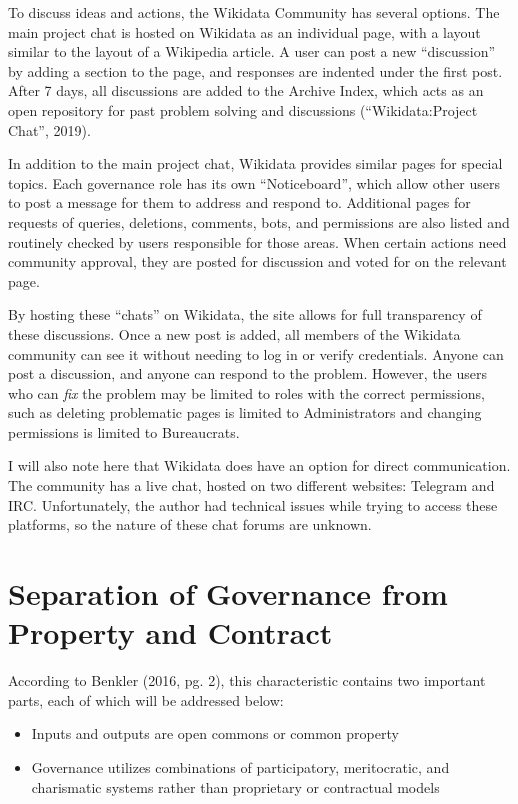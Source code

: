 \documentclass[]{article}
\begin{document}
To discuss ideas and actions, the Wikidata Community has several
options. The main project chat is hosted on Wikidata as an individual
page, with a layout similar to the layout of a Wikipedia article. A user
can post a new ``discussion'' by adding a section to the page, and
responses are indented under the first post. After 7 days, all
discussions are added to the Archive Index, which acts as an open
repository for past problem solving and discussions (``Wikidata:Project
Chat'', 2019).

In addition to the main project chat, Wikidata provides similar pages
for special topics. Each governance role has its own ``Noticeboard'',
which allow other users to post a message for them to address and
respond to. Additional pages for requests of queries, deletions,
comments, bots, and permissions are also listed and routinely checked by
users responsible for those areas. When certain actions need community
approval, they are posted for discussion and voted for on the relevant
page.

By hosting these ``chats'' on Wikidata, the site allows for full
transparency of these discussions. Once a new post is added, all members
of the Wikidata community can see it without needing to log in or verify
credentials. Anyone can post a discussion, and anyone can respond to the
problem. However, the users who can \emph{fix} the problem may be
limited to roles with the correct permissions, such as deleting
problematic pages is limited to Administrators and changing permissions
is limited to Bureaucrats.

I will also note here that Wikidata does have an option for direct
communication. The community has a live chat, hosted on two different
websites: Telegram and IRC. Unfortunately, the author had technical
issues while trying to access these platforms, so the nature of these
chat forums are unknown.

\hypertarget{separation-of-governance-from-property-and-contract}{%
\section{Separation of Governance from Property and
Contract}\label{separation-of-governance-from-property-and-contract}}

According to Benkler (2016, pg. 2), this characteristic contains two
important parts, each of which will be addressed below:

\begin{itemize}
\item
  Inputs and outputs are open commons or common property
\item
  Governance utilizes combinations of participatory, meritocratic, and
  charismatic systems rather than proprietary or contractual models
\end{itemize}
\end{document}
